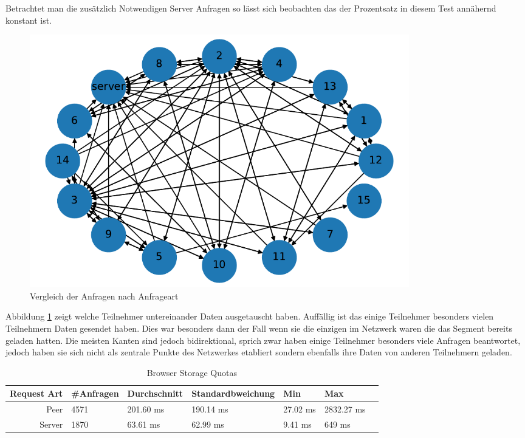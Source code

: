 Betrachtet man die zusätzlich Notwendigen Server Anfragen so lässt sich beobachten das der Prozentsatz in diesem Test annähernd konstant ist.  


\begin{figure}[!h]
	\centering
	\includegraphics[width=0.8\textwidth]{figures/15_clients_network}
	\caption[A Figure Short-Title]{Vergleich der Anfragen nach Anfrageart}
	\label{fig:15_clients_network}
\end{figure}

Abbildung \ref{fig:15_clients_network} zeigt welche Teilnehmer untereinander Daten ausgetauscht haben. Auffällig ist das einige Teilnehmer besonders vielen Teilnehmern Daten gesendet haben. Dies war besonders dann der Fall wenn sie die einzigen im Netzwerk waren die das Segment bereits geladen hatten. Die meisten Kanten sind jedoch bidirektional, sprich zwar haben einige Teilnehmer besonders viele Anfragen beantwortet, jedoch haben sie sich nicht als zentrale Punkte des Netzwerkes etabliert sondern ebenfalls ihre Daten von anderen Teilnehmern geladen.  

\begin{table}[!htb]
	\caption{Browser Storage Quotas }
\begin{center}

	\begin{tabular}{|r|l|l|l|l|l|l|}
		\hline
		Request Art	 & #Anfragen 	& Durchschnitt 	& Standardbweichung	& Min		& Max	 \\ \hline
		Peer 		& 4571 				& 201.60	 ms	  	& 190.14	 ms				& 27.02 ms	& 2832.27 ms \\ \hline
		Server 		& 1870		 		& 63.61 ms		& 62.99	ms				& 9.41 ms	& 649 ms	\\
		\hline
	\end{tabular}
\end{center}
\end{table}

